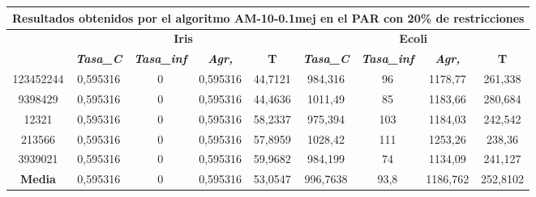 \documentclass[12pt, spanish]{article}
\begin{document}
\begin{table}[H]
\footnotesize
\begin{tabular}{|c|c|c|c|c|c|c|c|c|}
\hline
\multicolumn{9}{|c|}{\textbf{Resultados obtenidos por el algoritmo AM-10-0.1mej en el PAR con 20\% de restricciones}}                                                                                             \\ \hline
\multirow{2}{*}{} & \multicolumn{4}{c|}{\textbf{Iris}}                                                            & \multicolumn{4}{c|}{\textbf{Ecoli}}                                                           \\ \cline{2-9} 
                  & \textit{\textbf{Tasa\_C}} & \textit{\textbf{Tasa\_inf}} & \textit{\textbf{Agr,}} & \textbf{T} & \textit{\textbf{Tasa\_C}} & \textit{\textbf{Tasa\_inf}} & \textit{\textbf{Agr,}} & \textbf{T} \\ \hline
123452244         & 0,595316                  & 0                           & 0,595316               & 44,7121    & 984,316                   & 96                          & 1178,77                & 261,338    \\ \hline
9398429           & 0,595316                  & 0                           & 0,595316               & 44,4636    & 1011,49                   & 85                          & 1183,66                & 280,684    \\ \hline
12321             & 0,595316                  & 0                           & 0,595316               & 58,2337    & 975,394                   & 103                         & 1184,03                & 242,542    \\ \hline
213566            & 0,595316                  & 0                           & 0,595316               & 57,8959    & 1028,42                   & 111                         & 1253,26                & 238,36     \\ \hline
3939021           & 0,595316                  & 0                           & 0,595316               & 59,9682    & 984,199                   & 74                          & 1134,09                & 241,127    \\ \hline
\textbf{Media}    & 0,595316                  & 0                           & 0,595316               & 53,0547    & 996,7638                  & 93,8                        & 1186,762               & 252,8102   \\ \hline
\end{tabular}
\end{table}
\end{document}
